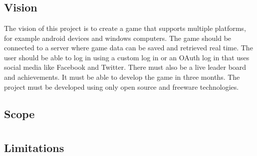 \documentclass[letterpaper]{article}
\begin{document}
		\newpage
		
		\section*{\colorbox{blue}{}} 
		\vspace{0.2in}
		
		\subsection*{Vision}
		\vspace{0.1in}
		
		The vision of this project is to create a game that supports multiple platforms, for example android devices and windows computers. The game should be connected to a server where game data can be saved and retrieved real time. The user should be able to log in using a custom log in or an OAuth log in that uses social media like Facebook and Twitter. There must also be a live leader board and achievements. It must be able to develop the game in three months. The project must be developed using only open source and freeware technologies.

		
		\vspace{0.2in}
		\subsection*{Scope}
		\vspace{0.1in}
		
		
		\vspace{0.2in}
		
		\section*{\colorbox{blue}{}} 
		\vspace{0.2in}
		
		\subsection*{Limitations}
		\vspace{0.1in}
		
\end{document}
